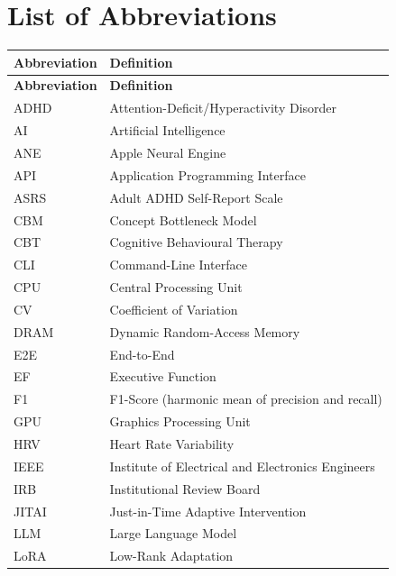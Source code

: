 \listoftables
{}
\newpage

\chapter*{List of Abbreviations}

\begin{longtable}{@{}l l@{}}
  \toprule
  \textbf{Abbreviation} & \textbf{Definition} \\
  \midrule
  \endfirsthead
  \toprule
  \textbf{Abbreviation} & \textbf{Definition} \\
  \midrule
  \endhead
  \bottomrule
  \endfoot
  ADHD   & Attention-Deficit/Hyperactivity Disorder \\
  AI     & Artificial Intelligence \\
  ANE    & Apple Neural Engine \\
  API    & Application Programming Interface \\
  ASRS   & Adult ADHD Self-Report Scale \\
  CBM    & Concept Bottleneck Model \\
  CBT    & Cognitive Behavioural Therapy \\
  CLI    & Command-Line Interface \\
  CPU    & Central Processing Unit \\
  CV     & Coefficient of Variation \\
  DRAM   & Dynamic Random-Access Memory \\
  E2E    & End-to-End \\
  EF     & Executive Function \\
  F1     & F1-Score (harmonic mean of precision and recall) \\
  GPU    & Graphics Processing Unit \\
  HRV    & Heart Rate Variability \\
  IEEE   & Institute of Electrical and Electronics Engineers \\
  IRB    & Institutional Review Board \\
  JITAI  & Just-in-Time Adaptive Intervention \\
  LLM    & Large Language Model \\
  LoRA   & Low-Rank Adaptation \\

\end{longtable}
